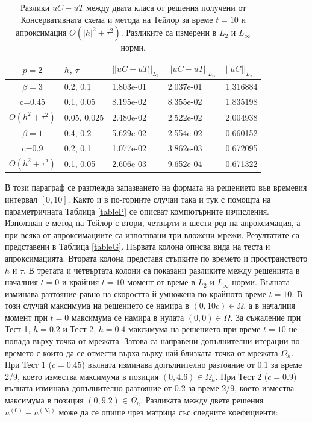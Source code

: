 \documentclass[a4paper]{article}
\theoremstyle{remark}
\begin{document}
\begin{table}[ht]
\centering
\small
		\begin{tabular}{||c|l|l|l|l||}
			\hline
			\hline
     $p=2$      &$h$, $\tau$  &   $||uC - uT||_{L_2}$     &  $||uC - uT||_{L_\infty}$ & $||uC||_{L_\infty}$ \\
   			\hline 
					\hline 
  $\beta=3$                  &0.2, 0.1         &  1.803e-01       &  2.037e-01& 1.316884     \\
   c=0.45                      &0.1, 0.05       &  8.195e-02       & 8.355e-02 	&  1.835198     \\
     $O(h^2 + \tau^ 2)$ &0.05, 0.025   & 2.480e-02        &2.522e-02  	&   2.004938   \\
			\hline 
			\hline 
       $\beta=1$          &0.4, 0.2        & 5.629e-02      & 2.554e-02 & 0.660152   \\
                  c=0.9      &0.2, 0.1        & 1.077e-02      & 3.862e-03  & 0.672095   \\
  $O(h^2+ \tau^2)$ &0.1, 0.05         & 2.606e-03     & 9.652e-04 & 0.671322   \\
			\hline
	   \hline
			\hline 
		\end{tabular}
		\caption{Разлики $uC - uT$ между двата класа от решения получени от Консервативната схема и метода на Тейлор за време $t=10$ и апроксимация $O(|h|^2 + \tau^2)$. Разликите са измерени в $L_2$ и $L_\infty$ норми.}
\label{tableF}
\end{table}
\FloatBarrier
В този параграф се разглежда запазването на формата на решението във времевия интервал $[0, 10]$. Както и в по-горните случаи така и тук с помощта на параметричната Таблица \ref{tableP} се описват компютърните изчисления. Използван е метод на Тейлор с втори, четвърти и шести ред на апроксимация, а при всяка от апроксимациите са използвани три вложени мрежи. Резултатите са представени в Таблица \ref{tableG}. Първата колона описва вида на теста и апроксимацията. Втората колона представя стъпките по времето и пространството $h$ и $\tau$. В третата и четвъртата колони са показани разликите между решенията в началния $t=0$ и крайния  $t=10$ момент от време в  $L_2$ и $L_\infty$ норми. Вълната изминава разтояние равно на скоростта й умножена по крайното време $t=10$. В този случай максимума на решението се намира в $(0, 10 c) \in \Omega$, а в началния момент при $t=0$ максимума се намира в нулата $(0, 0) \in \Omega$. За съжаление при Тест 1, $h=0.2$ и Тест 2, $h=0.4$ максимума на решението при време $t=10$ не попада върху точка от мрежата. Затова са направени допълнителни итерации по времето с които да се отмести върха върху най-близката точка от мрежата $\Omega_h$. При Тест 1 ($c=0.45$) вълната изминава допълнително разтояние от 0.1 за време 2/9, което измества максимума в позиция $(0, 4.6) \in \Omega_h$. При Тест 2 ($c=0.9$) вълната изминава допълнително разтояние от 0.2 за време 2/9, което измества максимума в позиция $(0, 9.2) \in \Omega_h$. Разликата между двете решения $u^{(0)} - u^{(N_t)}$ може да се опише чрез матрица със следните коефициенти:
\end{document}
